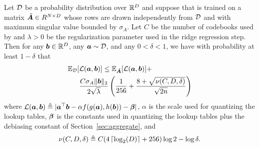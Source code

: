 \begin{theorem*} \label{thm:maddness}
Let $\mathcal{D}$ be a probability distribution over $\mathbb{R}^D$ and suppose that \oursp is trained on a matrix $\tilde{\bm{A}} \in R^{N \times D}$ whose rows are drawn independently from $\mathcal{D}$ and with maximum singular value bounded by $\sigma_A$. Let $C$ be the number of codebooks used by \oursp and $\lambda > 0$ be the regularization parameter used in the ridge regression step. %
Then for any $\bm{b} \in \mathbb{R}^D$, any $\bm{a} \sim \mathcal{D}$, and any $0 < \delta < 1$, we have with probability at least $1 - \delta$ that
\begin{align*}
    \begin{split}
    \mathbb{E}_{\mathcal{D}}[&\mathcal{L}(\bm{a}, \bm{b})] \le \mathbb{E}_{\tilde{\bm{A}}}[\mathcal{L}(\bm{a}, \bm{b})] + \\
    &\frac{C \sigma_A \lVert\bm{b}\rVert_2}{2 \sqrt{\lambda}} \left(
        \frac{1}{256} +
        \frac{
            8 +
            \sqrt{
                \nu(C, D, \delta)
            }
        }{\sqrt{2n}}
    \right)
    \end{split}
\end{align*}
where $\mathcal{L}(\bm{a}, \bm{b}) \triangleq |\bm{a}^\top \bm{b} - \alpha f(g(\bm{a}), h(\bm{b})) - \bm{\beta}|$, $\alpha$ is the scale used for quantizing the lookup tables, $\bm{\beta}$ is the constants used in quantizing the lookup tables plus the debiasing constant of Section~\ref{sec:aggregate}, and
\begin{align*}
    \nu(C, D, \delta) \triangleq C (4\left \lceil \log_2(D) \right \rceil + 256) \log{2} -\log{\delta}.
\end{align*}

\end{theorem*}

